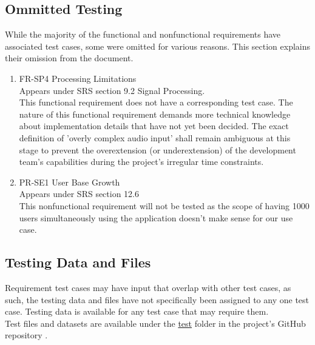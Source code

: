 \documentclass[12pt, titlepage]{article}
\begin{document}
\subsection{Ommitted Testing}
While the majority of the functional and nonfunctional requirements have associated test cases, 
some were omitted for various reasons. This section explains their omission from the document. 
\begin{enumerate}
  \item FR-SP4 Processing Limitations \\
  Appears under SRS section 9.2 Signal Processing. \\
  This functional requirement does not
  have a corresponding test case. The nature of this functional requirement demands more technical knowledge
  about implementation details that have not yet been decided. The exact definition of 'overly complex audio input' shall
  remain ambiguous at this stage to prevent the overextension (or underextension) of the development team's
  capabilities during the project's irregular time constraints.\\
  \item PR-SE1 User Base Growth\\
  Appears under SRS section 12.6\\
  This nonfunctional requirement will not be tested as the scope of having 1000 users simultaneously using the application doesn't make sense
  for our use case.\\
\end{enumerate}
\subsection{Testing Data and Files}
Requirement test cases may have input that overlap with other test cases, as such, the testing data and files have not specifically been
assigned to any one test case. Testing data is available for any test case that may require them. \\
Test files and datasets are available under the \href{https://github.com/emilyperica/ScoreGen/tree/9203b49bd6b54247517192c6b1992f5fa952478f/test}{test} folder
in the project's GitHub repository \citep{sample-formats, piano-refscales-on-C, piano-wholetone-scale-on-C, piano-c-major-scales, piano-chord-progression1, piano-c-major-asc-desc, 
piano-hot-cross-buns-solo}. \\
\newpage

\renewcommand\refname{Appendix C: References}


\end{document}
